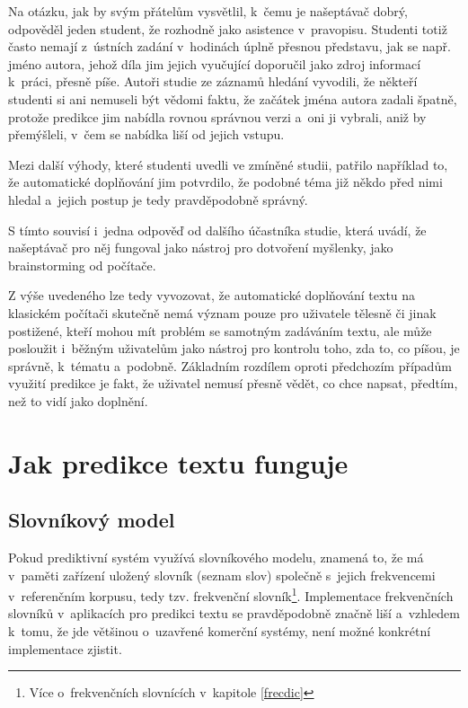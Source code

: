 \documentclass[a4paper,11pt,openany]{book} %
\begin{document}
Na otázku, jak by svým přátelům vysvětlil, k~čemu je našeptávač dobrý, odpověděl jeden student, že rozhodně jako asistence v~pravopisu. Studenti totiž často nemají z~ústních zadání v~hodinách úplně přesnou představu, jak se např. jméno autora, jehož díla jim jejich vyučující doporučil jako zdroj informací k~práci, přesně píše. Autoři studie ze záznamů hledání vyvodili, že někteří studenti si ani nemuseli být vědomi faktu, že začátek jména autora zadali špatně, protože predikce jim nabídla rovnou správnou verzi a~oni ji vybrali, aniž by přemýšleli, v~čem se nabídka liší od jejich vstupu. 

Mezi další výhody, které studenti uvedli ve zmíněné studii, patřilo například to, že automatické doplňování jim potvrdilo, že podobné téma již někdo před nimi hledal a~jejich postup je tedy pravděpodobně správný. 

S tímto souvisí i~jedna odpověď od dalšího účastníka studie, která uvádí, že našeptávač pro něj fungoval jako nástroj pro dotvoření myšlenky, jako brainstorming od počítače. 

Z výše uvedeného lze tedy vyvozovat, že automatické doplňování textu na klasickém počítači skutečně nemá význam pouze pro uživatele tělesně či jinak postižené, kteří mohou mít problém se samotným zadáváním textu, ale může posloužit i~běžným uživatelům jako nástroj pro kontrolu toho, zda to, co píšou, je správně, k~tématu a~podobně. Základním rozdílem oproti předchozím případům využití predikce je fakt, že uživatel nemusí přesně vědět, co chce napsat, předtím, než to vidí jako doplnění.

\chapter{Jak predikce textu funguje}

\section{Slovníkový model}

Pokud prediktivní systém využívá slovníkového modelu, znamená to, že má v~paměti zařízení uložený slovník (seznam slov) společně s~jejich frekvencemi v~referenčním korpusu, tedy tzv. frekvenční slovník\footnote{Více o~frekvenčních slovnících v~kapitole \ref{frecdic}}. %
Implementace frekvenčních slovníků v~aplikacích pro predikci textu se pravděpodobně značně liší a~vzhledem k~tomu, že jde většinou o~uzavřené komerční systémy, není možné konkrétní implementace zjistit. \parencite{alanhenry2014}
\end{document}
